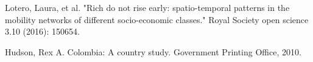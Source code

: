 \documentclass[runningheads]{llncs}
\begin{document}
\begin{thebibliography}{8}
	Lotero, Laura, et al. "Rich do not rise early: spatio-temporal patterns in the mobility networks of different socio-economic classes." Royal Society open science 3.10 (2016): 150654.
	
	Hudson, Rex A. Colombia: A country study. Government Printing Office, 2010.
	
%	
%	
%	
\end{thebibliography}
\end{document}
